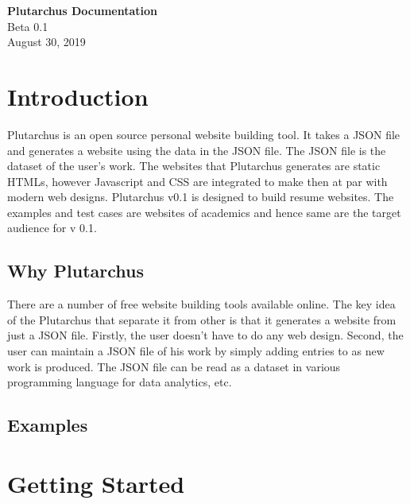 \documentclass[12pt]{article}
\newcommand{\blank}[1]{\hspace*{#1}\linebreak[0]}
\begin{document}
\begin{titlepage}
    \begin{center}
        \vspace*{1cm}
        \Huge
        \textbf{Plutarchus Documentation}
        \\
        \LARGE
        \vspace{0.5cm}
         Beta 0.1
         \\
        \vspace{1.5cm}
        \vspace{8.5cm}
        \vspace{1cm}
        \hspace{2cm}
        \blank{6cm} August 30, 2019
    \end{center}
 \end{titlepage}
 
    \tableofcontents
    \newpage
    \section{Introduction}

    Plutarchus is an open source personal website building tool. It takes a JSON file and generates a website using the data in the JSON file. The JSON file is the dataset of the user's work. The websites that Plutarchus generates are static HTMLs, however Javascript and CSS are integrated to make then at par with modern web designs. Plutarchus v0.1 is designed to build resume websites.
    The examples and test cases are websites of academics and hence same are the target audience for v 0.1.      
 
    \subsection{Why Plutarchus}

    There are a number of free website building tools available online. The key idea of the Plutarchus that separate it from other is that it generates a website from just a JSON file. Firstly, the user doesn't have to do any web design. Second, the user can maintain a JSON file of his work by simply adding entries to as new work is produced. The JSON file can be read as a dataset in various programming language for data analytics, etc.  
    

    \subsection{Examples}
    \section{Getting Started}
\end{document}
